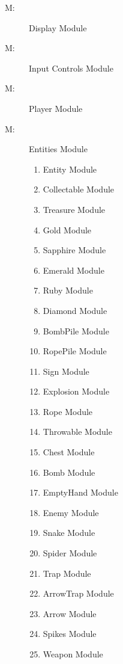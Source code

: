 \documentclass[12pt, titlepage]{article}
\newcounter{mnum}
\newcommand{\mthemnum}{M\themnum}
\begin{document}
\begin{description}
\item [ \mthemnum \label{mHH1}:] Display Module
\item [ \mthemnum \label{mHH2}:] Input Controls Module
\item [ \mthemnum \label{mBH1}:] Player Module
\item [ \mthemnum \label{mBH2}:] Entities Module
    {\color{red}\begin{enumerate}
        \item \label{mBH2.1} Entity Module
        \item \label{mBH2.2} Collectable Module
        \item \label{mBH2.3} Treasure Module
        \item \label{mBH2.4} Gold Module
        \item \label{mBH2.5} Sapphire Module
        \item \label{mBH2.6} Emerald Module
        \item \label{mBH2.7} Ruby Module
        \item \label{mBH2.8} Diamond Module
        \item \label{mBH2.9} BombPile Module
        \item \label{mBH2.10} RopePile Module
        \item \label{mBH2.11} Sign Module
        \item \label{mBH2.12} Explosion Module
        \item \label{mBH2.13} Rope Module
        \item \label{mBH2.14} Throwable Module
        \item \label{mBH2.15} Chest Module
        \item \label{mBH2.16} Bomb Module
        \item \label{mBH2.17} EmptyHand Module
        \item \label{mBH2.18} Enemy Module
        \item \label{mBH2.19} Snake Module
        \item \label{mBH2.20} Spider Module
        \item \label{mBH2.21} Trap Module
        \item \label{mBH2.22} ArrowTrap Module
        \item \label{mBH2.23} Arrow Module
        \item \label{mBH2.24} Spikes Module
        \item \label{mBH2.25} Weapon Module

\end{enumerate}}
\end{description}
\end{document}
